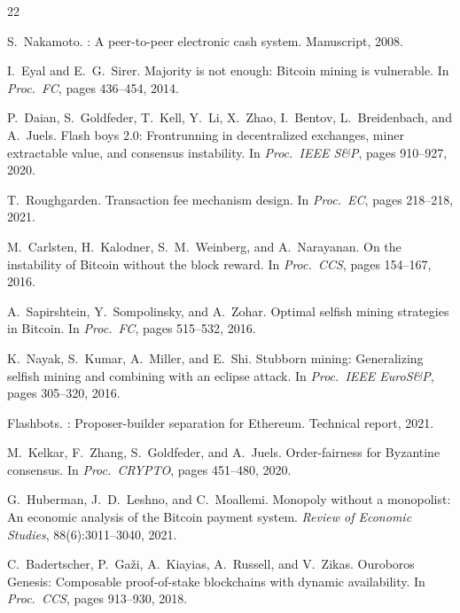 \documentclass[11pt,a4paper]{article}
\theoremstyle{definition}
\theoremstyle{remark}
\begin{document}
\begin{thebibliography}{22}

S.~Nakamoto.
: A peer-to-peer electronic cash system.
\newblock Manuscript, 2008.

I.~Eyal and E.~G.~Sirer.
\newblock Majority is not enough: {Bitcoin} mining is vulnerable.
\newblock In \emph{Proc.\ FC}, pages 436--454, 2014.

P.~Daian, S.~Goldfeder, T.~Kell, Y.~Li, X.~Zhao, I.~Bentov,
L.~Breidenbach, and A.~Juels.
\newblock Flash boys 2.0: Frontrunning in decentralized exchanges, miner
extractable value, and consensus instability.
\newblock In \emph{Proc.\ IEEE S\&P}, pages 910--927, 2020.

T.~Roughgarden.
\newblock Transaction fee mechanism design.
\newblock In \emph{Proc.\ EC}, pages 218--218, 2021.

M.~Carlsten, H.~Kalodner, S.~M.~Weinberg, and A.~Narayanan.
\newblock On the instability of {Bitcoin} without the block reward.
\newblock In \emph{Proc.\ CCS}, pages 154--167, 2016.

A.~Sapirshtein, Y.~Sompolinsky, and A.~Zohar.
\newblock Optimal selfish mining strategies in {Bitcoin}.
\newblock In \emph{Proc.\ FC}, pages 515--532, 2016.

K.~Nayak, S.~Kumar, A.~Miller, and E.~Shi.
\newblock Stubborn mining: Generalizing selfish mining and combining with
an eclipse attack.
\newblock In \emph{Proc.\ IEEE EuroS\&P}, pages 305--320, 2016.

Flashbots.
: Proposer-builder separation for {Ethereum}.
\newblock Technical report, 2021.

M.~Kelkar, F.~Zhang, S.~Goldfeder, and A.~Juels.
\newblock Order-fairness for {Byzantine} consensus.
\newblock In \emph{Proc.\ CRYPTO}, pages 451--480, 2020.

G.~Huberman, J.~D.~Leshno, and C.~Moallemi.
\newblock Monopoly without a monopolist: An economic analysis of the
{Bitcoin} payment system.
\newblock \emph{Review of Economic Studies}, 88(6):3011--3040, 2021.

C.~Badertscher, P.~Ga{\v{z}}i, A.~Kiayias, A.~Russell, and V.~Zikas.
\newblock Ouroboros {Genesis}: Composable proof-of-stake blockchains with
dynamic availability.
\newblock In \emph{Proc.\ CCS}, pages 913--930, 2018.


\end{thebibliography}
\end{document}
